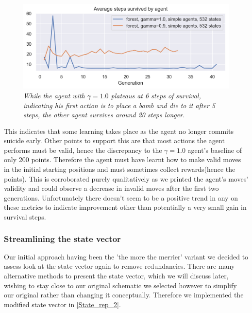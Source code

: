 \begin{figure}[!h]
\centering
	\includegraphics[width=\linewidth]{images/forest09_vs_forest1ste.png}
	\caption{\textit{While the agent with $\gamma = 1.0$ plateaus at 6 steps of survival, indicating his first action is to place a bomb and die to it after 5 steps, the other agent survives around 20 steps longer.}}
	\label{forest09_vs_forest1ste}
\end{figure}

This indicates that some learning takes place as the agent no longer commits suicide early. Other points to support this are that most actions the agent performs must be valid, hence the discrepancy to the $\gamma = 1.0$ agent's baseline of only 200 points. Therefore the agent must have learnt how to make valid moves in the initial starting positions and must sometimes collect rewards(hence the points). This is corroborated purely qualitatively as we printed the agent's moves' validity and could observe a decrease in invalid moves after the first two generations. Unfortunately there doesn't seem to be a positive trend in any on these metrics to indicate improvement other than potentially a very small gain in survival steps.

\subsubsection{Streamlining the state vector}
Our initial approach having been the 'the more the merrier' variant we decided to assess look at the state vector again to remove redundancies. There are many alternative methods to present the state vector, which we will discuss later, wishing to stay close to our original schematic we selected however to simplify our original rather than changing it conceptually. Therefore we implemented the modified state vector in \ref{State_rep_2}.


